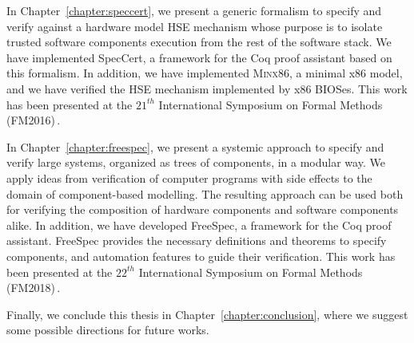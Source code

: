 In Chapter~\ref{chapter:speccert}, we present a generic formalism to specify and
verify against a hardware model HSE mechanism whose purpose is to isolate
trusted software components execution from the rest of the software stack. 
%
We have implemented SpecCert, a framework for the Coq proof assistant based on
this formalism. In addition, we have implemented {\scshape Minx86}, a minimal
x86 model, and we have verified the HSE mechanism implemented by x86 BIOSes.
%
This work has been presented at the $21^{th}$ International Symposium on Formal
Methods (FM2016)\,\cite{letan2016speccert}.

In Chapter~\ref{chapter:freespec}, we present a systemic approach to specify and
verify large systems, organized as trees of components, in a modular way.
%
We apply ideas from verification of computer programs with side effects to the
domain of component-based modelling. The resulting approach can be used both
for verifying the composition of hardware components and software components
alike.
%
In addition, we have developed FreeSpec, a framework for the Coq proof
assistant.
%
FreeSpec provides the necessary definitions and theorems to specify components,
and automation features to guide their verification.
%
This work has been presented at the $22^{th}$ International Symposium on Formal
Methods (FM2018)\,\cite{letan2018freespec}.

Finally, we conclude this thesis in Chapter~\ref{chapter:conclusion}, where we
suggest some possible directions for future works.
